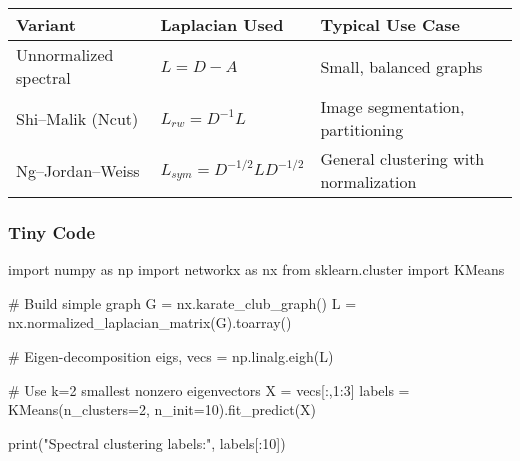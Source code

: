 \documentclass[
  letterpaper,
  DIV=11,
  numbers=noendperiod]{scrreprt}
\newenvironment{Shaded}{\begin{snugshade}}{\end{snugshade}}
\newcommand{\BuiltInTok}[1]{\textcolor[rgb]{0.00,0.23,0.31}{#1}}
\newcommand{\CommentTok}[1]{\textcolor[rgb]{0.37,0.37,0.37}{#1}}
\newcommand{\DecValTok}[1]{\textcolor[rgb]{0.68,0.00,0.00}{#1}}
\newcommand{\ImportTok}[1]{\textcolor[rgb]{0.00,0.46,0.62}{#1}}
\newcommand{\NormalTok}[1]{\textcolor[rgb]{0.00,0.23,0.31}{#1}}
\newcommand{\OperatorTok}[1]{\textcolor[rgb]{0.37,0.37,0.37}{#1}}
\newcommand{\StringTok}[1]{\textcolor[rgb]{0.13,0.47,0.30}{#1}}
\begin{document}
\begin{longtable}[]{@{}
  >{\raggedright\arraybackslash}p{}
  >{\raggedright\arraybackslash}p{}
  >{\raggedright\arraybackslash}p{}@{}}
\toprule\noalign{}
\begin{minipage}[b]{\linewidth}\raggedright
Variant
\end{minipage} & \begin{minipage}[b]{\linewidth}\raggedright
Laplacian Used
\end{minipage} & \begin{minipage}[b]{\linewidth}\raggedright
Typical Use Case
\end{minipage} \\
\midrule\noalign{}
\endhead
\bottomrule\noalign{}
\endlastfoot
Unnormalized spectral & \(L = D - A\) & Small, balanced graphs \\
Shi--Malik (Ncut) & \(L_{rw} = D^{-1}L\) & Image segmentation,
partitioning \\
Ng--Jordan--Weiss & \(L_{sym} = D^{-1/2}LD^{-1/2}\) & General clustering
with normalization \\
\end{longtable}

\subsubsection{Tiny Code}\label{tiny-code-168}

\begin{Shaded}
\begin{Highlighting}[]
\ImportTok{import}\NormalTok{ numpy }\ImportTok{as}\NormalTok{ np}
\ImportTok{import}\NormalTok{ networkx }\ImportTok{as}\NormalTok{ nx}
\ImportTok{from}\NormalTok{ sklearn.cluster }\ImportTok{import}\NormalTok{ KMeans}

\CommentTok{\# Build simple graph}
\NormalTok{G }\OperatorTok{=}\NormalTok{ nx.karate\_club\_graph()}
\NormalTok{L }\OperatorTok{=}\NormalTok{ nx.normalized\_laplacian\_matrix(G).toarray()}

\CommentTok{\# Eigen{-}decomposition}
\NormalTok{eigs, vecs }\OperatorTok{=}\NormalTok{ np.linalg.eigh(L)}

\CommentTok{\# Use k=2 smallest nonzero eigenvectors}
\NormalTok{X }\OperatorTok{=}\NormalTok{ vecs[:,}\DecValTok{1}\NormalTok{:}\DecValTok{3}\NormalTok{]}
\NormalTok{labels }\OperatorTok{=}\NormalTok{ KMeans(n\_clusters}\OperatorTok{=}\DecValTok{2}\NormalTok{, n\_init}\OperatorTok{=}\DecValTok{10}\NormalTok{).fit\_predict(X)}

\BuiltInTok{print}\NormalTok{(}\StringTok{"Spectral clustering labels:"}\NormalTok{, labels[:}\DecValTok{10}\NormalTok{])}
\end{Highlighting}
\end{Shaded}
\end{document}

